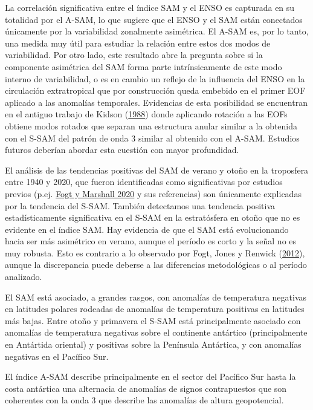 \documentclass[12pt,oneside,a4paper]{reedthesis}
\begin{document}
La correlación significativa entre el índice SAM y el ENSO es capturada en su totalidad por el A-SAM, lo que sugiere que el ENSO y el SAM están conectados únicamente por la variabilidad zonalmente asimétrica.
El A-SAM es, por lo tanto, una medida muy útil para estudiar la relación entre estos dos modos de variabilidad.
Por otro lado, este resultado abre la pregunta sobre si la componente asimétrica del SAM forma parte intrínsicamente de este modo interno de variabilidad, o es en cambio un reflejo de la influencia del ENSO en la circulación extratropical que por construcción queda embebido en el primer EOF aplicado a las anomalías temporales.
Evidencias de esta posibilidad se encuentran en el antiguo trabajo de Kidson (\protect\hyperlink{ref-kidson1988}{1988}) donde aplicando rotación a las EOFs obtiene modos rotados que separan una estructura anular similar a la obtenida con el S-SAM del patrón de onda 3 similar al obtenido con el A-SAM.
Estudios futuros deberían abordar esta cuestión con mayor profundidad.

El análisis de las tendencias positivas del SAM de verano y otoño en la troposfera entre 1940 y 2020, que fueron identificadas como significativas por estudios previos (p.ej. \protect\hyperlink{ref-fogt2020}{Fogt y Marshall 2020} y sus referencias) son únicamente explicadas por la tendencia del S-SAM.
También detectamos una tendencia positiva estadísticamente significativa en el S-SAM en la estratósfera en otoño que no es evidente en el índice SAM.
Hay evidencia de que el SAM está evolucionando hacia ser más asimétrico en verano, aunque el período es corto y la señal no es muy robusta.
Esto es contrario a lo observado por Fogt, Jones y Renwick (\protect\hyperlink{ref-fogt2012}{2012}), aunque la discrepancia puede deberse a las diferencias metodológicas o al período analizado.

El SAM está asociado, a grandes rasgos, con anomalías de temperatura negativas en latitudes polares rodeadas de anomalías de temperatura positivas en latitudes más bajas.
Entre otoño y primavera el S-SAM está principalmente asociado con anomalías de temperatura negativas sobre el continente antártico (principalmente en Antártida oriental) y positivas sobre la Península Antártica, y con anomalías negativas en el Pacífico Sur.

El índice A-SAM describe principalmente en el sector del Pacífico Sur hasta la costa antártica una alternacia de anomalías de signos contrapuestos que son coherentes con la onda 3 que describe las anomalías de altura geopotencial.
\end{document}
